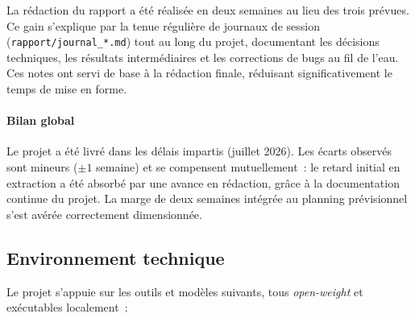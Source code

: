 \documentclass[11pt,a4paper]{article}
\begin{document}
La rédaction du rapport a été réalisée en deux semaines au lieu des trois prévues. Ce gain s'explique par la tenue régulière de journaux de session (\texttt{rapport/journal\_*.md}) tout au long du projet, documentant les décisions techniques, les résultats intermédiaires et les corrections de bugs au fil de l'eau. Ces notes ont servi de base à la rédaction finale, réduisant significativement le temps de mise en forme.

\paragraph{Bilan global}

Le projet a été livré dans les délais impartis (juillet 2026). Les écarts observés sont mineurs ($\pm 1$ semaine) et se compensent mutuellement~: le retard initial en extraction a été absorbé par une avance en rédaction, grâce à la documentation continue du projet. La marge de deux semaines intégrée au planning prévisionnel s'est avérée correctement dimensionnée.

\subsection{Environnement technique}

Le projet s'appuie sur les outils et modèles suivants, tous \textit{open-weight} et exécutables localement~:
\end{document}
